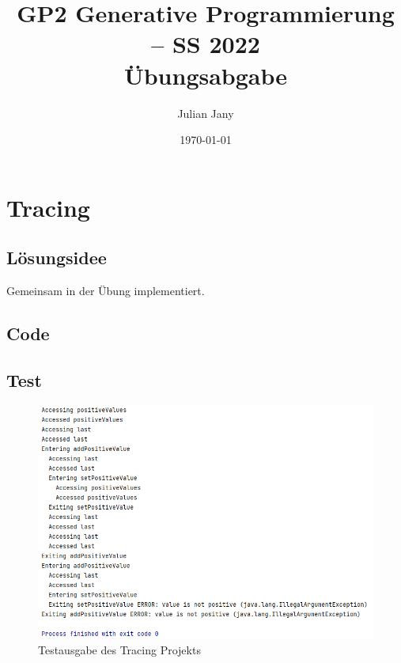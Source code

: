 \documentclass[german,notitlepage,smartquotes]{hgbreport}
\author{Julian Jany}                        %
\title{GP2 Generative Programmierung -- SS 2022\\ %
				Übungsabgabe \arabic{chapter}}
\date{\today}
\begin{document}
\maketitle



\section{Tracing}

\subsection{Lösungsidee}

Gemeinsam in der Übung implementiert.

\subsection{Code}






\subsection{Test}

\begin{figure}[h]
\centering
\includegraphics[width=.7\textwidth]{tracing-test-0}
\caption{Testausgabe des Tracing Projekts}
\label{fig:tracing-test-0}
\end{figure}
\end{document}
